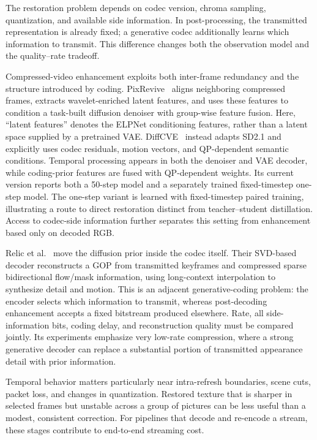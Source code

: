 The restoration problem depends on codec version, chroma sampling, quantization, and available side information. In post-processing, the transmitted representation is already fixed; a generative codec additionally learns which information to transmit. This difference changes both the observation model and the quality--rate tradeoff.

Compressed-video enhancement exploits both inter-frame redundancy and the structure introduced by coding. PixRevive~\cite{pixrevive} aligns neighboring compressed frames, extracts wavelet-enriched latent features, and uses these features to condition a task-built diffusion denoiser with group-wise feature fusion. Here, ``latent features'' denotes the ELPNet conditioning features, rather than a latent space supplied by a pretrained VAE. DiffCVE~\cite{diffcve} instead adapts SD2.1 and explicitly uses codec residuals, motion vectors, and QP-dependent semantic conditions. Temporal processing appears in both the denoiser and VAE decoder, while coding-prior features are fused with QP-dependent weights. Its current version reports both a 50-step model and a separately trained fixed-timestep one-step model. The one-step variant is learned with fixed-timestep paired training, illustrating a route to direct restoration distinct from teacher--student distillation. Access to codec-side information further separates this setting from enhancement based only on decoded RGB.

Relic et al.~\cite{stdpevc} move the diffusion prior inside the codec itself. Their SVD-based decoder reconstructs a GOP from transmitted keyframes and compressed sparse bidirectional flow/mask information, using long-context interpolation to synthesize detail and motion. This is an adjacent generative-coding problem: the encoder selects which information to transmit, whereas post-decoding enhancement accepts a fixed bitstream produced elsewhere. Rate, all side-information bits, coding delay, and reconstruction quality must be compared jointly. Its experiments emphasize very low-rate compression, where a strong generative decoder can replace a substantial portion of transmitted appearance detail with prior information.

Temporal behavior matters particularly near intra-refresh boundaries, scene cuts, packet loss, and changes in quantization. Restored texture that is sharper in selected frames but unstable across a group of pictures can be less useful than a modest, consistent correction. For pipelines that decode and re-encode a stream, these stages contribute to end-to-end streaming cost.

